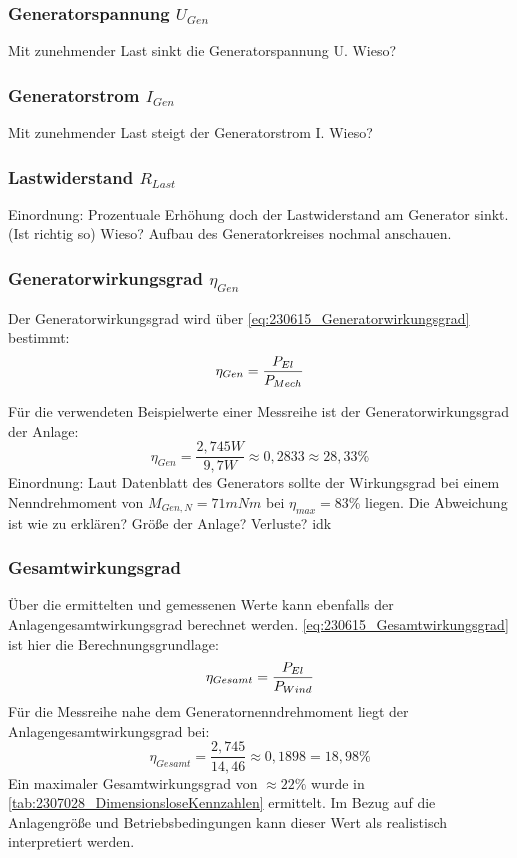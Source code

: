 \subsubsection*{Generatorspannung $U_{Gen}$}
Mit zunehmender Last sinkt die Generatorspannung U. Wieso?
\subsubsection*{Generatorstrom $I_{Gen}$}
Mit zunehmender Last steigt der Generatorstrom I. Wieso?
\subsubsection*{Lastwiderstand $R_{Last}$}
Einordnung: Prozentuale Erhöhung doch der Lastwiderstand am Generator sinkt. (Ist richtig so) Wieso? Aufbau des Generatorkreises nochmal anschauen.
\subsubsection*{Generatorwirkungsgrad $\eta_{Gen}$}
Der Generatorwirkungsgrad wird über \autoref{eq:230615_Generatorwirkungsgrad} bestimmt:
\begin{equation}
    \centering
    \eta_{Gen} = \frac{P_{El}}{P_{Mech}}
    \label{eq:230615_Generatorwirkungsgrad}
\end{equation}

Für die verwendeten Beispielwerte einer Messreihe ist der Generatorwirkungsgrad der Anlage:
$$\eta_{Gen} = \frac{2,745W}{9,7W} \approx 0,2833 \approx 28,33\% $$
Einordnung:
Laut Datenblatt des Generators sollte der Wirkungsgrad bei einem Nenndrehmoment von $M_{Gen,N}= 71 mNm$ bei $\eta_{max}=83\%$ liegen.
Die Abweichung ist wie zu erklären? Größe der Anlage? Verluste? idk
\subsubsection*{Gesamtwirkungsgrad}
Über die ermittelten und gemessenen Werte kann ebenfalls der Anlagengesamtwirkungsgrad berechnet werden.
\autoref{eq:230615_Gesamtwirkungsgrad} ist hier die Berechnungsgrundlage:
\begin{equation}
    \centering
    \eta_{Gesamt} = \frac{P_{El}}{P_{Wind}}
    \label{eq:230615_Gesamtwirkungsgrad}
\end{equation}
Für die Messreihe nahe dem Generatornenndrehmoment liegt der Anlagengesamtwirkungsgrad bei:
$$\eta_{Gesamt} = \frac{2,745}{14,46}\approx 0,1898 = 18,98\%$$
Ein maximaler Gesamtwirkungsgrad von $\approx 22\%$ wurde in \autoref{tab:2307028_DimensionsloseKennzahlen} ermittelt.
Im Bezug auf die Anlagengröße und Betriebsbedingungen kann dieser Wert als realistisch interpretiert werden.
